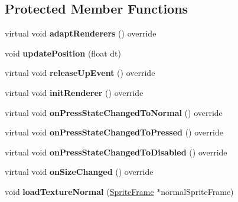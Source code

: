 \subsection*{Protected Member Functions}
\begin{DoxyCompactItemize}
\item 
\mbox{\label{classui_1_1EditBox_a0fb55c2070acc2eac1eba2ade69d39c0}} 
virtual void {\bfseries adapt\+Renderers} () override
\item 
\mbox{\label{classui_1_1EditBox_a9296bb3491261d52c6c5e92fe7d035ed}} 
void {\bfseries update\+Position} (float dt)
\item 
\mbox{\label{classui_1_1EditBox_a7b64c57f90d32124f43a8f9b2ec73ac2}} 
virtual void {\bfseries release\+Up\+Event} () override
\item 
\mbox{\label{classui_1_1EditBox_a1d06b29f0ca0258d6b4878d06713e0b2}} 
virtual void {\bfseries init\+Renderer} () override
\item 
\mbox{\label{classui_1_1EditBox_a8190e04cdd2a2f2103c89981df0e7dd6}} 
virtual void {\bfseries on\+Press\+State\+Changed\+To\+Normal} () override
\item 
\mbox{\label{classui_1_1EditBox_a85bbb7673a18c54fc1ce5d35e70bc6e7}} 
virtual void {\bfseries on\+Press\+State\+Changed\+To\+Pressed} () override
\item 
\mbox{\label{classui_1_1EditBox_aea002dbecefcf8ee053c2bc75789e983}} 
virtual void {\bfseries on\+Press\+State\+Changed\+To\+Disabled} () override
\item 
\mbox{\label{classui_1_1EditBox_a4fcd7ca359b4a6c42218ad9417b4655e}} 
virtual void {\bfseries on\+Size\+Changed} () override
\item 
\mbox{\label{classui_1_1EditBox_aea97dcc74ab1faf0775a7d583eed351f}} 
void {\bfseries load\+Texture\+Normal} (\hyperlink{classSpriteFrame}{Sprite\+Frame} $\ast$normal\+Sprite\+Frame)
\item 
\mbox{\label{classui_1_1EditBox_a0b31327037f7dbe8e447138b445ecab9}} 

\end{DoxyCompactItemize}
